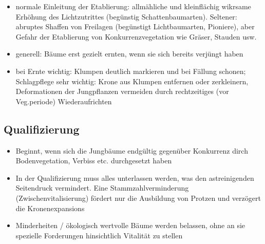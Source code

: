 \documentclass{article}
\begin{document}
\begin{itemize}
    \item normale Einleitung der Etablierung: allmähliche und kleinflächig wikrsame Erhöhung des Lichtzutrittes (begünstig Schattenbaumarten). Seltener: abruptes Shaffen von Freilagen (begünstigt Lichtbaumarten, Pioniere), aber Gefahr der Etablierung von Konkurrenzvegetation wie  Gräser, Stauden usw.
    
    \item generell: Bäume erst gezielt ernten, wenn sie sich bereits verjüngt haben
    
    \item bei Ernte wichtig: Klumpen deutlich markieren und bei Fällung schonen; Schlagpflege sehr wichtig: Krone aus Klumpen entfernen oder zerkleinern, Deformationen der Jungpflanzen vermeiden durch rechtzeitiges (vor Veg.periode) Wiederaufrichten
      
\end{itemize} 
  
  
  
\subsection{Qualifizierung}

\begin{itemize}

 \item Beginnt, wenn sich die Jungbäume endgültig gegenüber Konkurrenz dirch Bodenvegetation, Verbiss etc. durchgesetzt haben

 \item In der Qualifizierung muss alles unterlassen werden, was den astreinigenden Seitendruck vermindert. Eine Stammzahlverminderung (Zwischenvitalisierung) fördert nur die Ausbildung von Protzen und verzögert die Kronenexpansions

 \item Minderheiten / ökologisch wertvolle Bäume werden belassen, ohne an sie spezielle Forderungen hinsichtlich Vitalität zu stellen



































\end{itemize}
\end{document}
